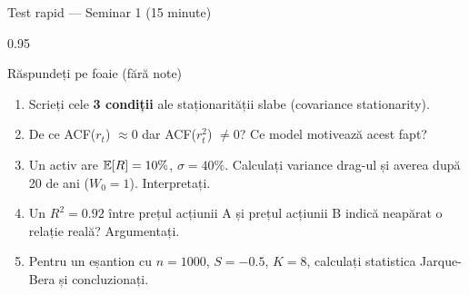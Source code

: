 \documentclass[9pt, aspectratio=169, t]{beamer}
\begin{document}
\begin{frame}[shrink=3]{Test rapid --- Seminar 1 (15 minute)}
    \begin{cminipage}{0.95\textwidth}
    \begin{alertblock}{Răspundeți pe foaie (fără note)}
    \begin{enumerate}\setlength{\itemsep}{0pt}
        \item Scrieți cele \textbf{3 condiții} ale staționarității slabe (covariance stationarity).
        \vspace{0.08cm}
        \item De ce ACF($r_t$) $\approx 0$ dar ACF($r_t^2$) $\neq 0$? Ce model motivează acest fapt?
        \vspace{0.08cm}
        \item Un activ are $\mathbb{E}[R] = 10\%$, $\sigma = 40\%$. Calculați variance drag-ul și averea după 20 de ani ($W_0 = 1$). Interpretați.
        \vspace{0.08cm}
        \item Un $R^2 = 0.92$ între prețul acțiunii A și prețul acțiunii B indică neapărat o relație reală? Argumentați.
        \vspace{0.08cm}
        \item Pentru un eșantion cu $n = 1000$, $S = -0.5$, $K = 8$, calculați statistica Jarque-Bera și concluzionați.
    \end{enumerate}
    \end{alertblock}
    \end{cminipage}
\end{frame}
\end{document}

